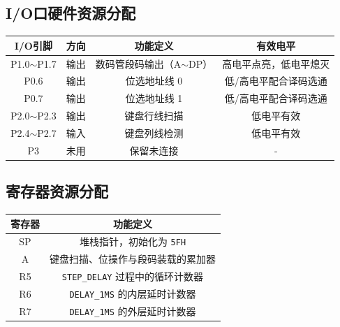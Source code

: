 \documentclass[12pt,a4paper]{article}
\begin{document}
\subsection{I/O口硬件资源分配}
\begin{table}[H]
    \centering
    \small
    \begin{tabular}{|c|c|c|c|}
        \hline
        I/O引脚 & 方向 & 功能定义 & 有效电平 \\
        \hline
        P1.0$\sim$P1.7 & 输出 & 数码管段码输出（A$\sim$DP） & 高电平点亮，低电平熄灭 \\
        \hline
        P0.6 & 输出 & 位选地址线 0 & 低/高电平配合译码选通 \\
        \hline
        P0.7 & 输出 & 位选地址线 1 & 低/高电平配合译码选通 \\
        \hline
        P2.0$\sim$P2.3 & 输出 & 键盘行线扫描 & 低电平有效 \\
        \hline
        P2.4$\sim$P2.7 & 输入 & 键盘列线检测 & 低电平有效 \\
        \hline
        P3 & 未用 & 保留未连接 & - \\
        \hline
    \end{tabular}
\end{table}

\subsection{寄存器资源分配}
\begin{table}[H]
    \centering
    \small
    \begin{tabular}{|c|c|}
        \hline
        寄存器 & 功能定义 \\
        \hline
        SP & 堆栈指针，初始化为 \texttt{5FH} \\
        \hline
        A & 键盘扫描、位操作与段码装载的累加器 \\
        \hline
        R5 & \texttt{STEP\_DELAY} 过程中的循环计数器 \\
        \hline
        R6 & \texttt{DELAY\_1MS} 的内层延时计数器 \\
        \hline
        R7 & \texttt{DELAY\_1MS} 的外层延时计数器 \\
        \hline
    \end{tabular}
\end{table}
\end{document}
